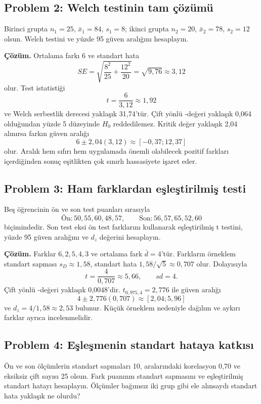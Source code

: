 \subsection*{Problem 2: Welch \tstat testinin tam çözümü}

Birinci grupta $n_1=25$, $\bar x_1=84$, $s_1=8$; ikinci grupta
$n_2=20$, $\bar x_2=78$, $s_2=12$ olsun. Welch testini ve yüzde 95 güven
aralığını hesaplayın.

\textbf{Çözüm.} Ortalama farkı 6 ve standart hata
\[
SE=\sqrt{\frac{8^2}{25}+\frac{12^2}{20}}
=\sqrt{9{,}76}\approx3{,}12
\]
olur. Test istatistiği
\[
t=\frac{6}{3{,}12}\approx1{,}92
\]
ve Welch serbestlik derecesi yaklaşık 31,74'tür. Çift yönlü \pval-değeri yaklaşık
0,064 olduğundan yüzde 5 düzeyinde $H_0$ reddedilemez. Kritik değer yaklaşık
2,04 alınırsa farkın güven aralığı
\[
6\pm2{,}04(3{,}12)\approx[-0{,}37;12{,}37]
\]
olur. Aralık hem sıfırı hem uygulamada önemli olabilecek pozitif farkları
içerdiğinden sonuç eşitlikten çok sınırlı hassasiyete işaret eder.

\subsection*{Problem 3: Ham farklardan eşleştirilmiş \tstat testi}

Beş öğrencinin ön ve son test puanları sırasıyla
\[
\text{Ön}: 50,55,60,48,57,
\qquad
\text{Son}: 56,57,65,52,60
\]
biçimindedir. Son test eksi ön test farklarını kullanarak eşleştirilmiş t
testini, yüzde 95 güven aralığını ve $d_z$ değerini hesaplayın.

\textbf{Çözüm.} Farklar $6,2,5,4,3$ ve ortalama fark
$\bar d=4$'tür. Farkların örneklem standart sapması
$s_D\approx1{,}58$, standart hata $1{,}58/\sqrt5\approx0{,}707$ olur.
Dolayısıyla
\[
t=\frac{4}{0{,}707}\approx5{,}66,
\qquad sd=4.
\]
Çift yönlü \pval-değeri yaklaşık 0,0048'dir. $t_{0{,}975,4}=2{,}776$ ile güven
aralığı
\[
4\pm2{,}776(0{,}707)\approx[2{,}04;5{,}96]
\]
ve $d_z=4/1{,}58\approx2{,}53$ bulunur. Küçük örneklem nedeniyle dağılım ve
aykırı farklar ayrıca incelenmelidir.

\subsection*{Problem 4: Eşleşmenin standart hataya katkısı}

Ön ve son ölçümlerin standart sapmaları 10, aralarındaki korelasyon 0,70 ve
eksiksiz çift sayısı 25 olsun. Fark puanının standart sapmasını ve
eşleştirilmiş standart hatayı hesaplayın. Ölçümler bağımsız iki grup gibi
ele alınsaydı standart hata yaklaşık ne olurdu?

